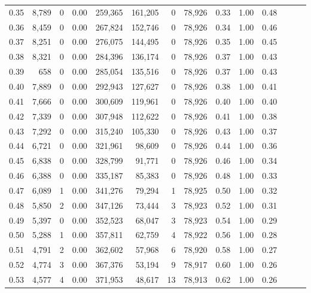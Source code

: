 \begin{tabular}{rrrrrrrrrrrrrr}
0.35 &  8,789 &      0 &  0.00 &  259,365 &  161,205 &       0 &  78,926 &  0.33 &  1.00 &      0.48 \\
0.36 &  8,459 &      0 &  0.00 &  267,824 &  152,746 &       0 &  78,926 &  0.34 &  1.00 &      0.46 \\
0.37 &  8,251 &      0 &  0.00 &  276,075 &  144,495 &       0 &  78,926 &  0.35 &  1.00 &      0.45 \\
0.38 &  8,321 &      0 &  0.00 &  284,396 &  136,174 &       0 &  78,926 &  0.37 &  1.00 &      0.43 \\
0.39 &    658 &      0 &  0.00 &  285,054 &  135,516 &       0 &  78,926 &  0.37 &  1.00 &      0.43 \\
0.40 &  7,889 &      0 &  0.00 &  292,943 &  127,627 &       0 &  78,926 &  0.38 &  1.00 &      0.41 \\
0.41 &  7,666 &      0 &  0.00 &  300,609 &  119,961 &       0 &  78,926 &  0.40 &  1.00 &      0.40 \\
0.42 &  7,339 &      0 &  0.00 &  307,948 &  112,622 &       0 &  78,926 &  0.41 &  1.00 &      0.38 \\
0.43 &  7,292 &      0 &  0.00 &  315,240 &  105,330 &       0 &  78,926 &  0.43 &  1.00 &      0.37 \\
0.44 &  6,721 &      0 &  0.00 &  321,961 &   98,609 &       0 &  78,926 &  0.44 &  1.00 &      0.36 \\
0.45 &  6,838 &      0 &  0.00 &  328,799 &   91,771 &       0 &  78,926 &  0.46 &  1.00 &      0.34 \\
0.46 &  6,388 &      0 &  0.00 &  335,187 &   85,383 &       0 &  78,926 &  0.48 &  1.00 &      0.33 \\
0.47 &  6,089 &      1 &  0.00 &  341,276 &   79,294 &       1 &  78,925 &  0.50 &  1.00 &      0.32 \\
0.48 &  5,850 &      2 &  0.00 &  347,126 &   73,444 &       3 &  78,923 &  0.52 &  1.00 &      0.31 \\
0.49 &  5,397 &      0 &  0.00 &  352,523 &   68,047 &       3 &  78,923 &  0.54 &  1.00 &      0.29 \\
0.50 &  5,288 &      1 &  0.00 &  357,811 &   62,759 &       4 &  78,922 &  0.56 &  1.00 &      0.28 \\
0.51 &  4,791 &      2 &  0.00 &  362,602 &   57,968 &       6 &  78,920 &  0.58 &  1.00 &      0.27 \\
0.52 &  4,774 &      3 &  0.00 &  367,376 &   53,194 &       9 &  78,917 &  0.60 &  1.00 &      0.26 \\
0.53 &  4,577 &      4 &  0.00 &  371,953 &   48,617 &      13 &  78,913 &  0.62 &  1.00 &      0.26 \\

\end{tabular}
